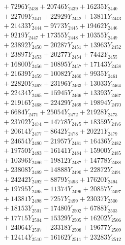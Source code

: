 \documentclass[a4paper,10pt]{article}
\begin{document}
{\begin{align}
&\;  + 7296 Y_{2438} + 20746 Y_{2439} + 16235 Y_{2440} \\[0.3ex]
&\;  + 22709 Y_{2441} + 22929 Y_{2442} + 13811 Y_{2443} \\[0.3ex]
&\;  + 21433 Y_{2444} + 9773 Y_{2445} + 19462 Y_{2446} \\[0.3ex]
&\;  + 9219 Y_{2447} + 17355 Y_{2448} + 10355 Y_{2449} \\[0.3ex]
&\;  + 23892 Y_{2450} + 20287 Y_{2451} + 13963 Y_{2452} \\[0.3ex]
&\;  + 23897 Y_{2453} + 20277 Y_{2454} + 7442 Y_{2455} \\[0.3ex]
&\;  + 16800 Y_{2456} + 10895 Y_{2457} + 17143 Y_{2458} \\[0.5ex]\allowbreak
&\;  + 21639 Y_{2459} + 10082 Y_{2460} + 9935 Y_{2461} \\[0.3ex]
&\;  + 22820 Y_{2462} + 23196 Y_{2463} + 13033 Y_{2464} \\[0.3ex]
&\;  + 22434 Y_{2465} + 15945 Y_{2466} + 13393 Y_{2467} \\[0.3ex]
&\;  + 21916 Y_{2468} + 22429 Y_{2469} + 19894 Y_{2470} \\[0.3ex]
&\;  + 6684 Y_{2471} + 25054 Y_{2472} + 21928 Y_{2473} \\[0.3ex]
&\;  + 23702 Y_{2474} + 14778 Y_{2475} + 18359 Y_{2476} \\[0.3ex]
&\;  + 20614 Y_{2477} + 8642 Y_{2478} + 20221 Y_{2479} \\[0.3ex]
&\;  + 24654 Y_{2480} + 21957 Y_{2481} + 16436 Y_{2482} \\[0.3ex]
&\;  + 19750 Y_{2483} + 16141 Y_{2484} + 15900 Y_{2485} \\[0.3ex]
&\;  + 10396 Y_{2486} + 19812 Y_{2487} + 14778 Y_{2488} \\[0.5ex]\allowbreak
&\;  + 23808 Y_{2489} + 14888 Y_{2490} + 22872 Y_{2491} \\[0.3ex]
&\;  + 24242 Y_{2492} + 8879 Y_{2493} + 17620 Y_{2494} \\[0.3ex]
&\;  + 19795 Y_{2495} + 11374 Y_{2496} + 20857 Y_{2497} \\[0.3ex]
&\;  + 14381 Y_{2498} + 7257 Y_{2499} + 23037 Y_{2500} \\[0.3ex]
&\;  + 18153 Y_{2501} + 17480 Y_{2502} + 6788 Y_{2503} \\[0.3ex]
&\;  + 17715 Y_{2504} + 15329 Y_{2505} + 16202 Y_{2506} \\[0.3ex]
&\;  + 24064 Y_{2507} + 23318 Y_{2508} + 19677 Y_{2509} \\[0.3ex]
&\;  + 12414 Y_{2510} + 16162 Y_{2511} + 23283 Y_{2512} \\[0.3ex]

\end{align}}
\end{document}

